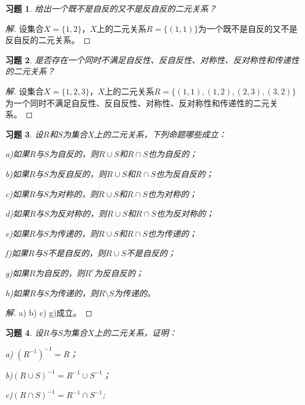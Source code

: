 \documentclass{article}
\begin{document}
\begin{CJK}{UTF8}{gbsn}
\newtheorem{Exercise}{习题}
\begin{Exercise}
给出一个既不是自反的又不是反自反的二元关系？
\end{Exercise}
\begin{proof}[解]
  设集合$X=\{1,2\}$，$X$上的二元关系$R=\{(1,1)\}$为一个既不是自反的又不是反自反的二元关系。
\end{proof}
\begin{Exercise}
是否存在一个同时不满足自反性、反自反性、对称性、反对称性和传递性的二元关系？
\end{Exercise}
\begin{proof}[解]
  设集合$X=\{1,2,3\}$，$X$上的二元关系$R=\{(1,1),(1,2),(2,3),(3,2)\}$为一个同时不满足自反性、反自反性、对称性、反对称性和传递性的二元关系。
\end{proof}
\begin{Exercise}
设$R$和$S$为集合$X$上的二元关系，下列命题哪些成立：

a)如果$R$与$S$为自反的，则$R\cup S$和$R\cap S$也为自反的；

b)如果$R$与$S$为反自反的，则$R\cup S$和$R\cap S$也为反自反的；

c)如果$R$与$S$为对称的，则$R\cup S$和$R\cap S$也为对称的；

d)如果$R$与$S$为反对称的，则$R\cup S$和$R\cap S$也为反对称的；

e)如果$R$与$S$为传递的，则$R\cup S$和$R\cap S$也为传递的；

f)如果$R$与$S$不是自反的，则$R\cup S$不是自反的；

g)如果$R$为自反的，则$R^c$为反自反的；

h)如果$R$与$S$为传递的，则$R\setminus S$为传递的。
\end{Exercise}
\begin{proof}[解]
  a) b) c) g)成立。
\end{proof}
\begin{Exercise}
  设$R$与$S$为集合$X$上的二元关系，证明：

  a) $(R^{-1})^{-1}=R$；

  b)$(R\cup S)^{-1}=R^{-1}\cup S^{-1}$；

  c)$(R\cap S)^{-1}=R^{-1}\cap S^{-1}$;


\end{Exercise}
\end{CJK}
\end{document}
